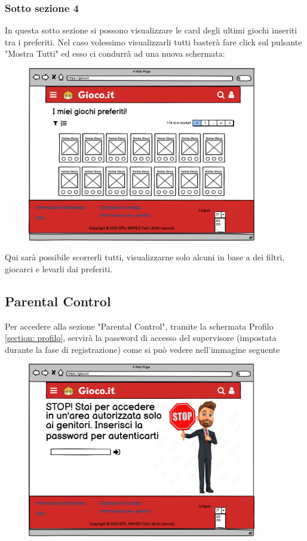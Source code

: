 \documentclass[../Report.tex]{subfiles}
\begin{document}
    \subsubsection{Sotto sezione 4}
    In questa sotto sezione si possono visualizzare le card degli ultimi giochi inseriti tra i preferiti. Nel caso volessimo visualizzarli tutti basterà fare click sul pulsante "Mostra Tutti" ed esso ci condurrà ad una nuova schermata:
    \begin{figure}[H]
        \includegraphics[width=10cm]{WPreferiti.png}
        \centering
    \end{figure}
    Qui sarà possibile scorrerli tutti, visualizzarne solo alcuni in base a dei filtri, giocarci e levarli dai preferiti.

    \subsection{Parental Control}
    \label{section: parental control}
    Per accedere alla sezione "Parental Control", tramite la schermata Profilo \ref{section: profilo}, servirà la password di accesso del supervisore (impostata durante la fase di registrazione) come si può vedere nell'immagine seguente
    \begin{figure}[H]
        \includegraphics[width=10cm]{WParentalControlAcces.png}
        \centering
    \end{figure}
\end{document}
